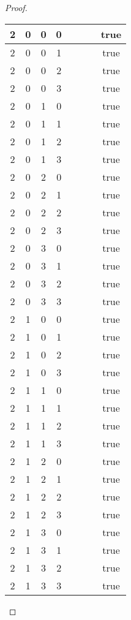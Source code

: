 \documentclass[10pt]{article}
\theoremstyle{definition}
\theoremstyle{plain}
\begin{document}
\begin{proof}
\begin{longtable}{|c|c|c|c|c|c|c|c|}
      2 & 0 & 0 & 0 &  &  &  & true \tabularnewline \hline
      2 & 0 & 0 & 1 &  &  &  & true \tabularnewline \hline
      2 & 0 & 0 & 2 &  &  &  & true \tabularnewline \hline
      2 & 0 & 0 & 3 &  &  &  & true \tabularnewline \hline
      2 & 0 & 1 & 0 &  &  &  & true \tabularnewline \hline
      2 & 0 & 1 & 1 &  &  &  & true \tabularnewline \hline
      2 & 0 & 1 & 2 &  &  &  & true \tabularnewline \hline
      2 & 0 & 1 & 3 &  &  &  & true \tabularnewline \hline
      2 & 0 & 2 & 0 &  &  &  & true \tabularnewline \hline
      2 & 0 & 2 & 1 &  &  &  & true \tabularnewline \hline
      2 & 0 & 2 & 2 &  &  &  & true \tabularnewline \hline
      2 & 0 & 2 & 3 &  &  &  & true \tabularnewline \hline
      2 & 0 & 3 & 0 &  &  &  & true \tabularnewline \hline
      2 & 0 & 3 & 1 &  &  &  & true \tabularnewline \hline
      2 & 0 & 3 & 2 &  &  &  & true \tabularnewline \hline
      2 & 0 & 3 & 3 &  &  &  & true \tabularnewline \hline
      2 & 1 & 0 & 0 &  &  &  & true \tabularnewline \hline
      2 & 1 & 0 & 1 &  &  &  & true \tabularnewline \hline
      2 & 1 & 0 & 2 &  &  &  & true \tabularnewline \hline
      2 & 1 & 0 & 3 &  &  &  & true \tabularnewline \hline
      2 & 1 & 1 & 0 &  &  &  & true \tabularnewline \hline
      2 & 1 & 1 & 1 &  &  &  & true \tabularnewline \hline
      2 & 1 & 1 & 2 &  &  &  & true \tabularnewline \hline
      2 & 1 & 1 & 3 &  &  &  & true \tabularnewline \hline
      2 & 1 & 2 & 0 &  &  &  & true \tabularnewline \hline
      2 & 1 & 2 & 1 &  &  &  & true \tabularnewline \hline
      2 & 1 & 2 & 2 &  &  &  & true \tabularnewline \hline
      2 & 1 & 2 & 3 &  &  &  & true \tabularnewline \hline
      2 & 1 & 3 & 0 &  &  &  & true \tabularnewline \hline
      2 & 1 & 3 & 1 &  &  &  & true \tabularnewline \hline
      2 & 1 & 3 & 2 &  &  &  & true \tabularnewline \hline
      2 & 1 & 3 & 3 &  &  &  & true \tabularnewline \hline


\end{longtable}
\end{proof}
\end{document}
